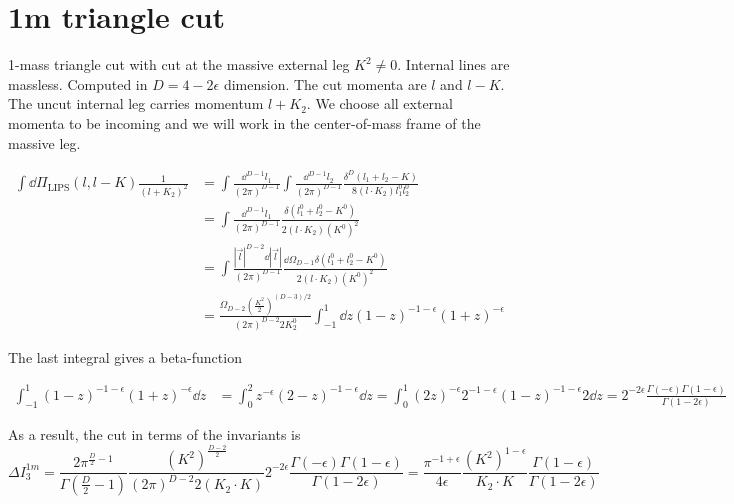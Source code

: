 \section{1m triangle cut}
1-mass triangle cut with cut at the massive external leg $K^2 \neq 0$.
Internal lines are massless. 
Computed in $D=4-2\epsilon$ dimension.
The cut momenta are $l$ and $l-K$.
The uncut internal leg carries momentum $l + K_2$. 
We choose all external momenta to be incoming and we will work in the center-of-mass frame of the massive leg.

\begin{equation*}
\begin{split}
\int\dd \Pi_{\textrm{LIPS}}(l, l-K) \frac{1}{(l+K_2)^2} & =
\int\frac{\dd^{D-1}l_1}{(2\pi)^{D-1}}\int\frac{\dd^{D-1}l_2}{(2\pi)^{D-1}}
\frac{\delta^{D}(l_1 + l_2 - K)}{8(l\cdot K_2)l_1^0 l_2^0}
\\
& = \int\frac{\dd^{D-1}l_1}{(2\pi)^{D-1}}\frac{\delta(l_1^0 + l_2^0 - K^0)}{2(l\cdot K_2)(K^0)^2} 
\\
& = \int\frac{|\vec{l}|^{D-2}\dd |\vec{l}|}{(2\pi)^{D-1}} \frac{\dd\Omega_{D-1}\delta(l_1^0 + l_2^0 - K^0)}{2 ( l \cdot K_2)(K^0)^2}
\\
& = \frac{\Omega_{D-2}(\frac{K^2}{2})^{(D-3)/2}}{(2\pi)^{D-2}2K_2^0} \int_{-1}^1\dd z (1-z)^{-1-\epsilon}(1+z)^{-\epsilon}
\end{split} 
\end{equation*}

The last integral gives a beta-function

\begin{equation*}
\begin{split}
\int^1_{-1} (1-z)^{-1-\epsilon}(1+z)^{-\epsilon} \dd z & = 
\int^2_{0} z^{-\epsilon}(2-z)^{-1-\epsilon} \dd z 
=\int^1_0(2z)^{-\epsilon} 2^{-1-\epsilon} (1-z)^{-1-\epsilon} 2 \dd z
=2^{-2\epsilon}\frac{\Gamma(-\epsilon)\Gamma(1-\epsilon)}{\Gamma(1-2\epsilon)}
\end{split}
\end{equation*}

As a result, the cut in terms of the invariants is
\begin{equation*}
\Delta I_3^{1m} = 
\frac{2\pi^{\frac{D}{2}-1}}{\Gamma(\frac{D}{2}-1)}\frac{(K^2)^{\frac{D-2}{2}}}{(2\pi)^{D-2}2(K_2\cdot K)} 2^{-2\epsilon}\frac{\Gamma(-\epsilon)\Gamma(1-\epsilon)}{\Gamma(1-2\epsilon)}
=
\frac{\pi^{-1+\epsilon}}{4\epsilon}\frac{(K^{2})^{1-\epsilon}}{K_2\cdot K}\frac{\Gamma(1-\epsilon)}{\Gamma(1-2\epsilon)}
\end{equation*}